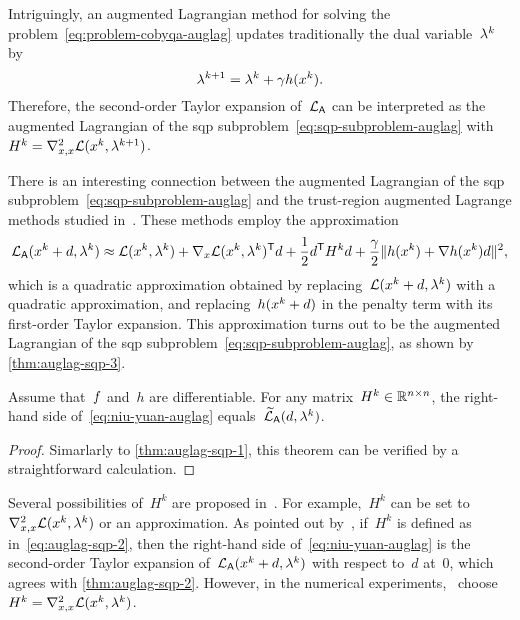 Intriguingly, an augmented Lagrangian method for solving the problem~\cref{eq:problem-cobyqa-auglag} updates traditionally the dual variable~$\lm[k]$ by
\begin{equation*}
    \lm[k + 1] = \lm[k] + \gamma h(\iter[k]).
\end{equation*}
Therefore, the second-order Taylor expansion of~$\mathcal{L}_{\mathsf{A}}$ can be interpreted as the augmented Lagrangian of the \gls{sqp} subproblem~\cref{eq:sqp-subproblem-auglag} with~$H^k = \nabla_{x, x}^2 \lag(\iter[k], \lm[k + 1])$.

There is an interesting connection between the augmented Lagrangian of the \gls{sqp} subproblem~\cref{eq:sqp-subproblem-auglag} and the trust-region augmented Lagrange methods studied in~\cite{Niu_Yuan_2010,Wang_Yuan_2014}.
These methods employ the approximation
\begin{equation}
    \label{eq:niu-yuan-auglag}
    \auglag(\iter[k] + \step, \lm[k]) \approx \lag(\iter[k], \lm[k]) + \nabla_x \lag(\iter[k], \lm[k])^{\T} d + \frac{1}{2} d^{\T} H^k d + \frac{\gamma}{2} \norm{h(\iter[k]) + \nabla h(\iter[k]) \step}^2,
\end{equation}
which is a quadratic approximation obtained by replacing~$\lag(\iter[k] + d, \lm[k])$ with a quadratic approximation, and replacing~$h(\iter[k] + d)$ in the penalty term with its first-order Taylor expansion.
This approximation turns out to be the augmented Lagrangian of the \gls{sqp} subproblem~\cref{eq:sqp-subproblem-auglag}, as shown by \cref{thm:auglag-sqp-3}.

\begin{theorem}
    \label{thm:auglag-sqp-3}
    Assume that~$f$ and~$h$ are differentiable.
    For any matrix~$H^k \in \mathbb{R}^{n \times n}$, the right-hand side of~\cref{eq:niu-yuan-auglag} equals~$\auglagalt(\step, \lm[k])$.
\end{theorem}

\begin{proof}
    Simarlarly to \cref{thm:auglag-sqp-1}, this theorem can be verified by a straightforward calculation.
\end{proof}

Several possibilities of~$H^k$ are proposed in~\cite{Niu_Yuan_2010,Wang_Yuan_2014}.
For example,~$H^k$ can be set to~$\nabla_{x, x}^2 \lag(\iter[k], \lm[k])$ or an approximation.
As pointed out by~\cite[\S~2.1]{Niu_Yuan_2010}, if~$H^k$ is defined as in~\cref{eq:auglag-sqp-2}, then the right-hand side of~\cref{eq:niu-yuan-auglag} is the second-order Taylor expansion of~$\auglag(\iter[k] + d, \lm[k])$ with respect to~$d$ at~$0$, which agrees with \cref{thm:auglag-sqp-2}.
However, in the numerical experiments,~\cite{Niu_Yuan_2010,Wang_Yuan_2014} choose~$H^k = \nabla_{x, x}^2 \lag(\iter[k], \lm[k])$.

